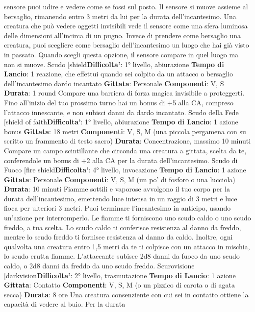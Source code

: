 \begin{multicols}{2}
sensore puoi udire e vedere come se fossi sul posto. Il
sensore si muove assieme al bersaglio, rimanendo
entro 3 metri da lui per la durata dell’incantesimo. Una
creatura che può vedere oggetti invisibili vede il 
sensore come una sfera luminosa delle dimensioni
all’incirca di un pugno.
Invece di prendere come bersaglio una creatura, puoi
scegliere come bersaglio dell’incantesimo un luogo che
hai già visto in passato. Quando scegli questa opzione,
il sensore compare in quel luogo ma non si muove.
Scudo
[shield\textbf{Difficolta'}:
1° livello, abiurazione
\textbf{Tempo di Lancio}: 1 reazione, che effettui quando sei
colpito da un attacco o bersaglio dell’incantesimo dardo
incantato
\textbf{Gittata}: Personale
\textbf{Componenti}: V, S
\textbf{Durata}: 1 round
Compare una barriera di forza magica invisibile a
proteggerti. Fino all’inizio del tuo prossimo turno hai un
bonus di +5 alla CA, compreso l’attacco innescante, e
non subisci danni da dardo incantato.
Scudo della Fede
[shield of faith\textbf{Difficolta'}:
1° livello, abiurazione
\textbf{Tempo di Lancio}: 1 azione bonus
\textbf{Gittata}: 18 metri
\textbf{Componenti}: V, S, M (una piccola pergamena con su
scritto un frammento di testo sacro)
\textbf{Durata}: Concentrazione, massimo 10 minuti
Compare un campo scintillante che circonda una
creatura a gittata, scelta da te, conferendole un bonus
di +2 alla CA per la durata dell’incantesimo.
Scudo di Fuoco
[fire shield\textbf{Difficolta'}:
4° livello, invocazione
\textbf{Tempo di Lancio}: 1 azione
\textbf{Gittata}: Personale
\textbf{Componenti}: V, S, M (un po’ di fosforo o una lucciola)
\textbf{Durata}: 10 minuti
Fiamme sottili e vaporose avvolgono il tuo corpo per la
durata dell’incantesimo, emettendo luce intensa in un
raggio di 3 metri e luce fioca per ulteriori 3 metri. Puoi
terminare l’incantesimo in anticipo, usando un’azione
per interromperlo.
Le fiamme ti forniscono uno scudo caldo o uno scudo
freddo, a tua scelta. Lo scudo caldo ti conferisce
resistenza al danno da freddo, mentre lo scudo freddo ti
fornisce resistenza al danno da caldo.
Inoltre, ogni qualvolta una creatura entro 1,5 metri da te
ti colpisce con un attacco in mischia, lo scudo erutta
fiamme. L’attaccante subisce 2d8 danni da fuoco da
uno scudo caldo, o 2d8 danni da freddo da uno scudo
freddo.
Scurovisione
[darkvision\textbf{Difficolta'}:
2° livello, trasmutazione
\textbf{Tempo di Lancio}: 1 azione
\textbf{Gittata}: Contatto
\textbf{Componenti}: V, S, M (o un pizzico di carota o di agata
secca)
\textbf{Durata}: 8 ore
Una creatura consenziente con cui sei in contatto
ottiene la capacità di vedere al buio. Per la durata

\end{multicols}

